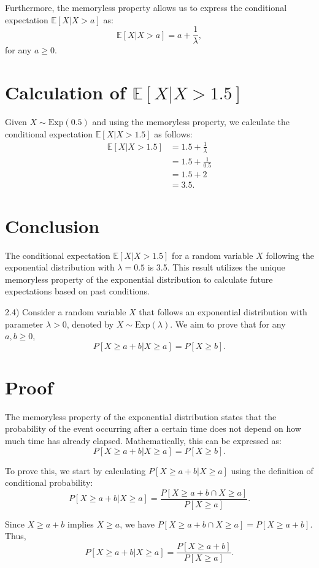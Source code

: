 \documentclass{article}
\begin{document}
Furthermore, the memoryless property allows us to express the conditional expectation \(\mathbb{E}[X | X > a]\) as:
\[ \mathbb{E}[X | X > a] = a + \frac{1}{\lambda}, \]
for any \(a \geq 0\).

\section*{Calculation of \(\mathbb{E}[X | X > 1.5]\)}
Given \(X \sim \text{Exp}(0.5)\) and using the memoryless property, we calculate the conditional expectation \(\mathbb{E}[X | X > 1.5]\) as follows:
\begin{align*}
\mathbb{E}[X | X > 1.5] &= 1.5 + \frac{1}{\lambda} \\
&= 1.5 + \frac{1}{0.5} \\
&= 1.5 + 2 \\
&= 3.5.
\end{align*}

\section*{Conclusion}
The conditional expectation \(\mathbb{E}[X | X > 1.5]\) for a random variable \(X\) following the exponential distribution with \(\lambda = 0.5\) is 3.5. This result utilizes the unique memoryless property of the exponential distribution to calculate future expectations based on past conditions.


2.4)
Consider a random variable \(X\) that follows an exponential distribution with parameter \(\lambda > 0\), denoted by \(X \sim \text{Exp}(\lambda)\). We aim to prove that for any \(a, b \geq 0\),
\[ P[X \geq a + b | X \geq a] = P[X \geq b]. \]

\section*{Proof}

The memoryless property of the exponential distribution states that the probability of the event occurring after a certain time does not depend on how much time has already elapsed. Mathematically, this can be expressed as:
\[ P[X \geq a + b | X \geq a] = P[X \geq b]. \]

To prove this, we start by calculating \(P[X \geq a + b | X \geq a]\) using the definition of conditional probability:
\[ P[X \geq a + b | X \geq a] = \frac{P[X \geq a + b \cap X \geq a]}{P[X \geq a]}. \]

Since \(X \geq a + b\) implies \(X \geq a\), we have \(P[X \geq a + b \cap X \geq a] = P[X \geq a + b]\). Thus,
\[ P[X \geq a + b | X \geq a] = \frac{P[X \geq a + b]}{P[X \geq a]}. \]
\end{document}
